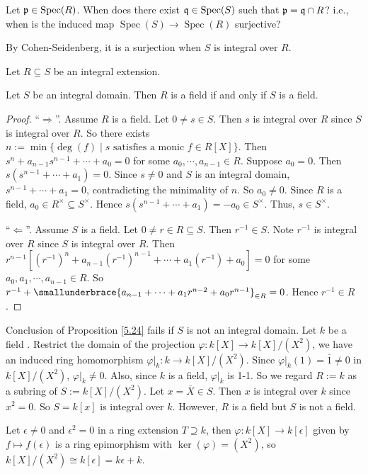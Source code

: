 \begin{discussion}\label{5.23}
    Let $\mathfrak{p} \in \operatorname{Spec}(R)$. When does there exist $\mathfrak{q} \in \operatorname{Spec}(S)$ such that $\mathfrak{p} = \mathfrak{q} \cap R$? i.e., when is the induced map $\operatorname{Spec}(S) \to \operatorname{Spec}(R)$ surjective? \par 
    By Cohen-Seidenberg, it is a surjection when $S$ is integral over $R$.
\end{discussion}

\noindent Let $R \subseteq S$ be an integral extension.

\begin{proposition}\label{5.24}
    Let $S$ be an integral domain. Then $R$ is a field if and only if $S$ is a field.
\end{proposition}

\begin{proof}
    ``$\Rightarrow$''. Assume $R$ is a field. Let $0 \neq s \in S$. Then $s$ is integral over $R$ since $S$ is integral over $R$. So there exists $n := \min\{\deg(f) \mid s \text{ satisfies a monic }f \in R[X]\}$. Then $s^{n} + a_{n-1}s^{n-1} + \cdots + a_0 = 0$ for some $a_0,\cdots,a_{n-1} \in R$. Suppose $a_0 = 0$. Then $s(s^{n-1} + \cdots + a_1) = 0$. Since $s \neq 0$ and $S$ is an integral domain, $s^{n-1} + \cdots +a_1 = 0$, contradicting the minimality of $n$. So $a_0 \neq 0$. Since $R$ is a field, $a_0 \in R^{\times} \subseteq S^{\times}$. Hence $s(s^{n-1} + \cdots + a_1) = -a_0 \in S^{\times}$. Thus, $s \in S^{\times}$. \par 
    ``$\Leftarrow$''. Assume $S$ is a field. Let $0 \neq r \in R \subseteq S$. Then $r^{-1} \in S$. Note $r^{-1}$ is integral over $R$ since $S$ is integral over $R$. Then $r^{n-1}[(r^{-1})^{n} + a_{n-1}(r^{-1})^{n-1} + \cdots + a_1(r^{-1}) + a_0] = 0$ for some $a_0,a_1,\cdots,a_{n-1} \in R$. So $r^{-1} + \smallunderbrace{a_{n-1} + \cdots + a_1r^{n-2} + a_0r^{n-1}}_{\in R} = 0$. Hence $r^{-1} \in R$.
\end{proof}

\begin{example*}
    Conclusion of Proposition \ref{5.24} fails if $S$ is not an integral domain. Let $k$ be a field . Restrict the domain of the projection $\varphi: k[X] \to k[X]/(X^{2})$, we have an induced ring homomorphism $\varphi|_k: k \to k[X]/(X^{2})$. Since $\varphi|_k(1) = \overbar{1} \neq 0$ in $k[X]/(X^{2})$, $\varphi|_k \neq 0$. Also, since $k$ is a field, $\varphi|_k$ is 1-1. So we regard $R := k$ as a subring of $S := k[X]/(X^{2})$. Let $x = \overbar{X} \in S$. Then $x$ is integral over $k$ since $x^{2} = 0$. So $S = k[x]$ is integral over $k$. However, $R$ is a field but $S$ is not a field.  \par
    Let $\epsilon \neq 0$ and $\epsilon^{2} = 0$ in a ring extension $T \supseteq k$, then $\varphi: k[X] \to k[\epsilon]$ given by $f \mapsto f(\epsilon)$ is a ring epimorphism with $\ker(\varphi) = (X^{2})$, so $k[X]/(X^{2}) \cong k[\epsilon] = k\epsilon + k$.
\end{example*}

